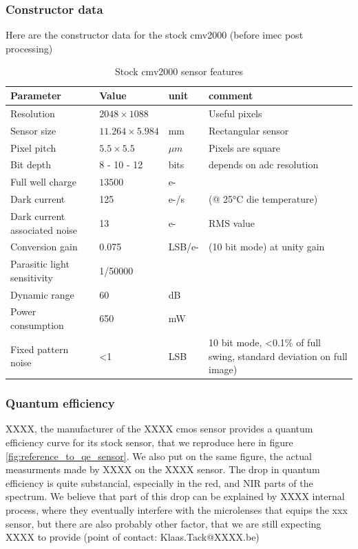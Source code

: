 \documentclass{article}
\begin{document}
    \subsubsection{Constructor data}
      Here are the constructor data for the stock cmv2000 (before imec post processing)
      \begin{table}
	\centering
	\begin{tabular}{|l|l|l|l|}
	  \hline
	  \textbf{Parameter} & \textbf{Value} & \textbf{unit} & \textbf{comment}\\
	  \hline
	    Resolution & $2048 \times 1088$ & & Useful pixels \\
	    Sensor size & $11.264 \times 5.984$ & mm & Rectangular sensor \\
	    Pixel pitch & $5.5 \times 5.5$ & $\mu m$ & Pixels are square \\
	    Bit depth & 8 - 10 - 12 & bits & depends on adc resolution\\
	    Full well charge & $13500$ & e- & \\
	    Dark current & 125 & e-/s & (@ 25°C die temperature) \\
	    Dark current associated noise & 13 & e- & RMS value \\
	    Conversion gain & 0.075 & LSB/e- & (10 bit mode) at unity gain\\
	    Parasitic light sensitivity & 1/50000 & & \\
	    Dynamic range & 60 & dB & \\
	    Power consumption & 650 & mW & \\
	    Fixed pattern noise & <1 & LSB & 10 bit mode, <0.1\% of full swing, standard deviation on full image) \\
	  \hline
	\end{tabular}
	\caption{Stock cmv2000 sensor features}
	\label{tab:stock_cmv_features}
      \end{table}

    \subsubsection{Quantum efficiency}
      XXXX, the manufacturer of the XXXX cmos sensor provides a quantum efficiency curve for its stock sensor, that
      we reproduce here in figure \ref{fig:reference_to_qe_sensor}.
      We also put on the same figure, the actual measurments made by XXXX on the XXXX sensor. The drop in quantum efficiency is quite substancial, especially in the red, and NIR parts of the spectrum. We believe that part of this drop can be explained by XXXX internal process, where they eventually interfere with the microlenses that equips the xxx sensor, but there are also probably other factor, that we are still expecting XXXX to provide (point of contact: Klaas.Tack@XXXX.be)
\end{document}
